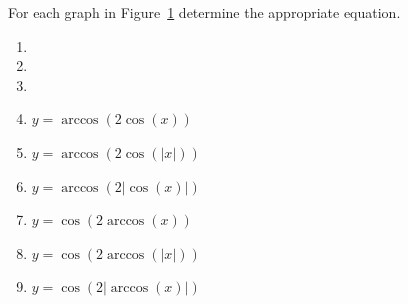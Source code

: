 \begin{Exercise} For each graph in Figure~\ref{grafs} determine the appropriate equation.
\begin{multicols}{3}
\begin{enumerate}
\item[]
\item[]
\item[]
\item[(1)] $y=\arccos(2\cos(x))$
\item[(2)] $y=\arccos(2\cos(|x|))$
\item[(3)] $y=\arccos(2|\cos(x)|)$
\item[(4)] $y=\cos(2\arccos(x))$
\item[(5)] $y=\cos(2\arccos(|x|))$
\item[(6)] $y=\cos(2|\arccos(x)|)$ 
\end{enumerate}
\EndCurrentQuestion
\end{multicols}


\begin{figure}[H]
\centerline{
\hspace*{0.5cm}
}
\centerline{
\hspace*{0.5cm}
}
\caption{\label{grafs}}
\end{figure}
\end{Exercise}

